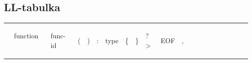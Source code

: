 \documentclass[11pt,a4paper]{article}
\renewcommand{\familydefault}{\sfdefault}
\begin{document}
    \subsection{LL-tabulka}

    \renewcommand{\familydefault}{\ttdefault}

    \begin{table}[h!]
        \begin{tabular}{|l|l|l|l|l|l|l|l|l|l|l|l|l|l|l|l|l|l|l|l|l|}
            \hline
                                             & \begin{sideways}function   \ \end{sideways}
                                                        & \begin{sideways}func-id\end{sideways}   
                                                                    & \begin{sideways}(\end{sideways}
                                                                            & \begin{sideways})\end{sideways}
                                                                                    & \begin{sideways}:\end{sideways}
                                                                                            & \begin{sideways}type\end{sideways}
                                                                                                    & \begin{sideways}\{\end{sideways}
                                                                                                            & \begin{sideways}\}\end{sideways}
                                                                                                                    & \begin{sideways}?\textgreater{}\end{sideways}
                                                                                                                                        & \begin{sideways}EOF\end{sideways}
                                                                                                                                                & \begin{sideways},\end{sideways}

\end{tabular}
\end{table}
\end{document}
